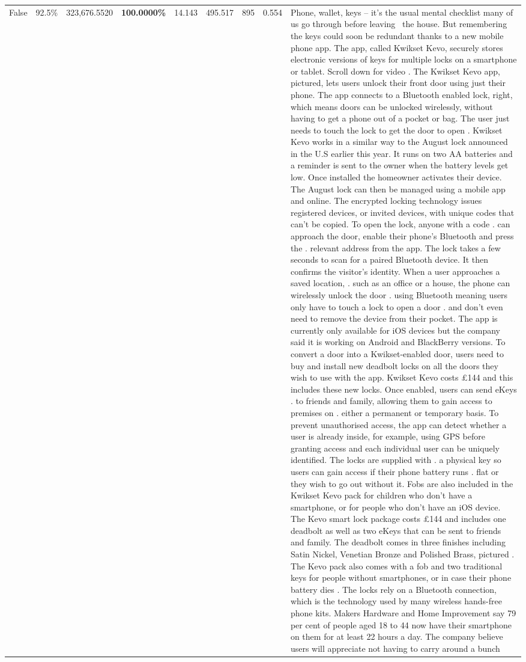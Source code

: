 \begin{table}[H]
\begin{tabular}{lllrlllll}
False & 92.5\% & 323,676.5520 & \bfseries \color{red} 100.0000\% & 14.143 & 495.517 & 895 & 0.554 & Phone, wallet, keys – it’s the usual mental checklist many of us go through before leaving  the house. But remembering the keys could soon be redundant thanks to a new mobile phone app. The app, called Kwikset Kevo, securely stores electronic versions of keys for multiple locks on a smartphone or tablet. Scroll down for video . The Kwikset Kevo app, pictured, lets users unlock their front door using just their phone. The app connects to a Bluetooth enabled lock, right, which means doors can be unlocked wirelessly, without having to get a phone out of a pocket or bag. The user just needs to touch the lock to get the door to open . Kwikset Kevo works in a similar way to the August lock announced in the U.S earlier this year. It runs on two AA batteries and a reminder is sent to the owner when the battery levels get low. Once installed the homeowner activates their device. The August lock can then be managed using a mobile app and online. The encrypted locking technology issues registered devices, or invited devices, with unique codes that can't be copied. To open the lock, anyone with a code . can approach the door, enable their phone's Bluetooth and press the . relevant address from the app. The lock takes a few seconds to scan for a paired Bluetooth device. It then confirms the visitor's identity. When a user approaches a saved location, . such as an office or a house, the phone can wirelessly unlock the door . using Bluetooth meaning users only have to touch a lock to open a door . and don't even need to remove the device from their pocket. The app is currently only available for iOS devices but the company said it is working on Android and BlackBerry versions. To convert a door into a Kwikset-enabled door, users need to buy and install new deadbolt locks on all the doors they wish to use with the app. Kwikset Kevo costs £144 and this includes these new locks. Once enabled, users can send eKeys . to friends and family, allowing them to gain access to premises on . either a permanent or temporary basis. To prevent unauthorised access, the app can detect whether a user is already inside, for example, using GPS before granting access and each individual user can be uniquely identified. The locks are supplied with . a physical key so users can gain access if their phone battery runs . flat or they wish to go out without it. Fobs are also included in the Kwikset Kevo pack for children who don't have a smartphone, or for people who don't have an iOS device. The Kevo smart lock package costs £144 and includes one deadbolt as well as two eKeys that can be sent to friends and family. The deadbolt comes in three finishes including Satin Nickel, Venetian Bronze and Polished Brass, pictured . The Kevo pack also comes with a fob and two traditional keys for people without smartphones, or in case their phone battery dies . The locks rely on a Bluetooth connection, which is the technology used by many wireless hands-free phone kits. Makers Hardware and Home Improvement say 79 per cent of people aged 18 to 44 now have their smartphone on them for at least 22 hours a day. The company believe users will appreciate not having to carry around a bunch 
\end{tabular}
\end{table}
